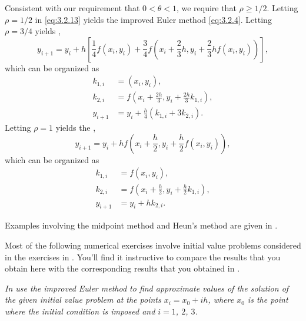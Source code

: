 Consistent with our requirement that $0<\theta<1$, we require that
$\rho\ge1/2$. Letting $\rho=1/2$ in \eqref{eq:3.2.13} yields the improved
Euler method \eqref{eq:3.2.4}. Letting $\rho=3/4$ yields
,
\[
y_{i+1}=y_i+h\left[\frac{1}{4}f(x_i,y_i)+\frac{3}{4}f\left(
x_i+\frac{2}{3}h,y_i+\frac{2}{3}hf(x_i,y_i)\right)\right],
\]
which can be organized as
\begin{align*}
k_{1,i}&=(x_i,y_i),\\
k_{2,i}&=f\left(x_i+\frac{2h}{3},y_i+\frac{2h}{3}k_{1,i}\right),\\
y_{i+1}&=y_i+\frac{h}{4}(k_{1,i}+3k_{2,i}).
\end{align*}
Letting $\rho=1$ yields the ,
\[
y_{i+1}=y_i+hf\left(x_i+\frac{h}{2},y_i+\frac{h}{2}f(x_i,y_i)\right),
\]
which can be organized as
\begin{align*}
k_{1,i}&=f(x_i,y_i),\\
k_{2,i}&=f\left(x_i+\frac{h}{2},y_i+\frac{h}{2}k_{1,i}\right),\\
y_{i+1}&=y_i+hk_{2,i}.
\end{align*}

Examples involving the midpoint method and Heun's method are given in
.

\exercises
Most of the following numerical exercises involve initial value
problems considered in the exercises in . You'll
find it instructive to compare the results that you obtain here with
the corresponding results that you obtained in .

\emph{In  use the improved
Euler method
to find approximate values of the solution of the given initial value
problem at the points $x_i=x_0+ih$, where $x_0$ is the point where
the initial condition is imposed and $i=1$, $2$, $3$.}

